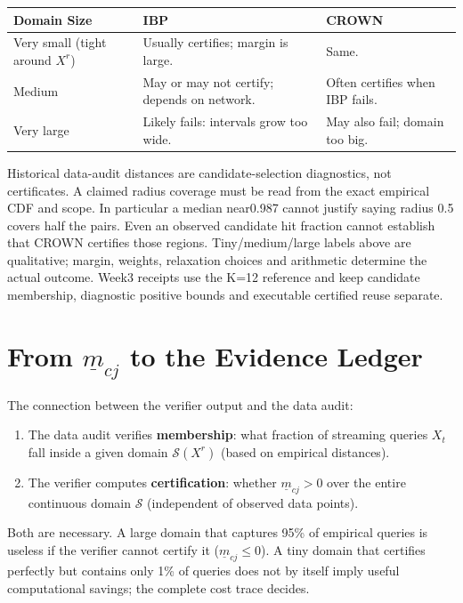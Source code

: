 \documentclass[11pt, a4paper]{article}
\theoremstyle{definition}
\theoremstyle{plain}
\newcommand{\mbm}[1]{\underline{m}_{#1}}
\begin{document}
\begin{center}
\small
\begin{tabularx}{\linewidth}{@{}lYY@{}}
\toprule
Domain Size & IBP & CROWN \\
\midrule
Very small (tight around $X^r$) & Usually certifies; margin is large. & Same. \\
Medium & May or may not certify; depends on network. & Often certifies when IBP fails. \\
Very large & Likely fails: intervals grow too wide. & May also fail; domain too big. \\
\bottomrule
\end{tabularx}
\end{center}

Historical data-audit distances are candidate-selection diagnostics, not
certificates. A claimed radius coverage must be read from the exact empirical
CDF and scope. In particular a median near0.987 cannot justify saying radius 0.5
covers half the pairs. Even an observed candidate hit fraction cannot establish
that CROWN certifies those regions. Tiny/medium/large labels above are
qualitative; margin, weights, relaxation choices and arithmetic determine the
actual outcome. Week3 receipts use the K=12 reference and keep candidate
membership, diagnostic positive bounds and executable certified reuse separate.

\section{From $\underline{m}_{cj}$ to the Evidence Ledger}

The connection between the verifier output and the data audit:

\begin{enumerate}[leftmargin=2em]
  \item The data audit verifies \textbf{membership}: what fraction of streaming
        queries $X_t$ fall inside a given domain $\mathcal{S}(X^r)$ (based on
        empirical distances).
  \item The verifier computes \textbf{certification}: whether $\mbm{cj} > 0$ over
        the entire continuous domain $\mathcal{S}$ (independent of observed data points).
\end{enumerate}

Both are necessary. A large domain that captures 95\% of empirical queries is
useless if the verifier cannot certify it ($\mbm{cj} \le 0$). A tiny domain
that certifies perfectly but contains only 1\% of queries does not by itself imply useful computational savings; the complete cost trace decides.
\end{document}
